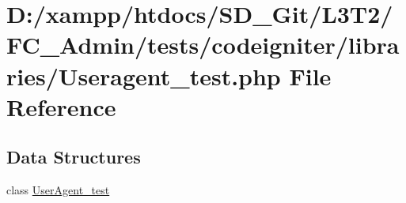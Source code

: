 \hypertarget{_useragent__test_8php}{}\section{D\+:/xampp/htdocs/\+S\+D\+\_\+\+Git/\+L3\+T2/\+F\+C\+\_\+\+Admin/tests/codeigniter/libraries/\+Useragent\+\_\+test.php File Reference}
\label{_useragent__test_8php}
\subsection*{Data Structures}
\begin{DoxyCompactItemize}
\item 
class \hyperlink{class_user_agent__test}{User\+Agent\+\_\+test}
\end{DoxyCompactItemize}
